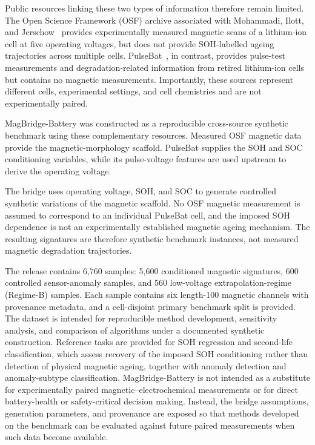 \documentclass[11pt]{article}
\begin{document}
Public resources linking these two types of information therefore remain limited. The Open Science Framework (OSF) archive associated with Mohammadi, Ilott, and Jerschow~\cite{hu2020,mohammadi2020osf} provides experimentally measured magnetic scans of a lithium-ion cell at five operating voltages, but does not provide SOH-labelled ageing trajectories across multiple cells.  PulseBat~\cite{tao2024pulsebat,tao2024pulsebatdata}, in contrast, provides pulse-test measurements and degradation-related information from retired lithium-ion cells but contains no magnetic measurements. Importantly, these sources
represent different cells, experimental settings, and cell chemistries and are not experimentally paired.

MagBridge-Battery was constructed as a reproducible
cross-source synthetic benchmark using these complementary
resources. Measured OSF magnetic data provide the
magnetic-morphology scaffold. PulseBat supplies the
SOH and SOC conditioning variables, while its
pulse-voltage features are used upstream to derive
the operating voltage.

The bridge uses operating voltage, SOH, and SOC to
generate controlled synthetic variations of the
magnetic scaffold. No OSF magnetic measurement is
assumed to correspond to an individual PulseBat cell,
and the imposed SOH dependence is not an experimentally
established magnetic ageing mechanism. The resulting
signatures are therefore synthetic benchmark instances,
not measured magnetic degradation trajectories.

The release contains 6,760 samples: 5,600 conditioned magnetic signatures,
600 controlled sensor-anomaly samples, and 560 low-voltage
extrapolation-regime (Regime-B) samples. Each sample contains six length-100
magnetic channels with provenance metadata, and a cell-disjoint primary
benchmark split is provided. The dataset is intended for reproducible method
development, sensitivity analysis, and comparison of algorithms under a
documented synthetic construction. Reference tasks are provided for SOH regression and second-life classification, which assess recovery of the imposed SOH conditioning rather than detection of physical magnetic ageing, together with anomaly detection and anomaly-subtype classification. MagBridge-Battery is not intended as a
substitute for experimentally paired magnetic--electrochemical measurements
or for direct battery-health or safety-critical decision making. Instead,
the bridge assumptions, generation parameters, and provenance are exposed so
that methods developed on the benchmark can be evaluated against future
paired measurements when such data become available.
\end{document}
